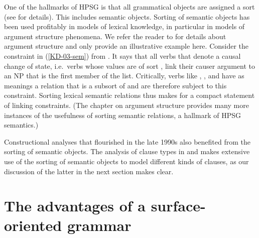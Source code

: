 \documentclass[output=paper
	        ,collection
	        ,collectionchapter
 	        ,biblatex
                ,babelshorthands
                ,newtxmath
                ,draftmode
                ,colorlinks, citecolor=brown
]{langscibook}
\begin{document}
One of the hallmarks of HPSG is that all grammatical objects are assigned a sort (see  for details). This includes semantic objects. Sorting of semantic objects has been used profitably in models of lexical knowledge, in particular in models of argument structure phenomena. We refer the reader to  for details about argument structure and only provide an illustrative example here. Consider the constraint in (\ref{KD-03-sem}) from \citet[231]{KoenigandDavis2003}. It says that all verbs that denote a causal change of state, i.e.\ verbs whose  values are of sort ,
 link their causer argument to an NP that is the first member of the  list. Critically, verbs like , , and  have as meanings a relation that is a subsort of  and are therefore subject to this constraint. Sorting lexical semantic relations thus makes for a compact statement of linking constraints. (The chapter on argument structure provides many more instances of the usefulness of sorting semantic relations, a hallmark of HPSG semantics.)

\begin{exe}
	\ex\label{KD-03-sem}
\end{exe}

Constructional analyses that flourished in the late 1990s also benefited from the sorting of semantic objects. The analysis  of clause types in \citet{Sag1997} and \citet{GinzburgandSag2001} makes extensive use of the sorting of semantic objects to model different kinds of clauses, as our discussion of the latter in the next section makes clear.

\section{The advantages of a surface-oriented grammar}
\label{sec:adv}
\end{document}
